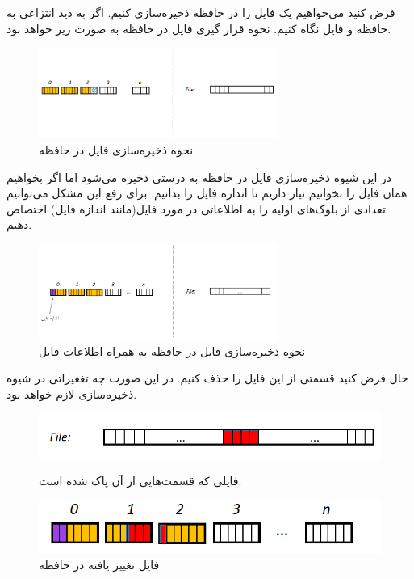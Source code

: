 \begin{flushright}
    فرض کنید می‌خواهیم یک فایل را در حافظه ذخیره‌سازی کنیم.
    اگر به دید انتزاعی به حافظه و فایل نگاه کنیم.
    نحوه قرار گیری فایل در حافظه به صورت زیر خواهد بود.

    \begin{figure}[H]
        \centering
        \includegraphics[width=0.7\textwidth]{source/file-in-memory-model-1}
        \caption{نحوه ذخیره‌سازی فایل در حافظه}
        \label{fig:file-in-memory-model-1}
    \end{figure}

    در این شیوه ذخیره‌سازی فایل در حافظه به درستی ذخیره می‌شود اما اگر بخواهیم همان فایل را بخوانیم نیاز داریم تا اندازه فایل را بدانیم.
    برای رفع این مشکل می‌توانیم تعدادی از بلوک‌های اولیه را به اطلاعاتی در مورد فایل(مانند اندازه فایل) اختصاص دهیم.

    \begin{figure}[H]
        \centering
        \includegraphics[width=0.7\textwidth]{source/file-in-memory-model-2}
        \caption{نحوه ذخیره‌سازی فایل در حافظه به همراه اطلاعات فایل}
        \label{fig:file-in-memory-model-2}
    \end{figure}

    حال فرض کنید قسمتی از این فایل را حذف کنیم.
    در این صورت چه تغغیراتی در شیوه ذخیره‌سازی لازم خواهد بود.

    \begin{figure}[H]
        \includegraphics[width=\linewidth]{source/file-deleted-parts}
        \caption{فایلی که قسمت‌هایی از آن پاک شده است.}\label{fig:file-deleted-parts}
        \endminipage\hfill
        \includegraphics[width=\linewidth]{source/file-in-memory-model-3}
        \caption{فایل تغییر یافته در حافظه}\label{fig:file-in-memory-model-3}
        \endminipage\hfill
    \end{figure}


\end{flushright}
